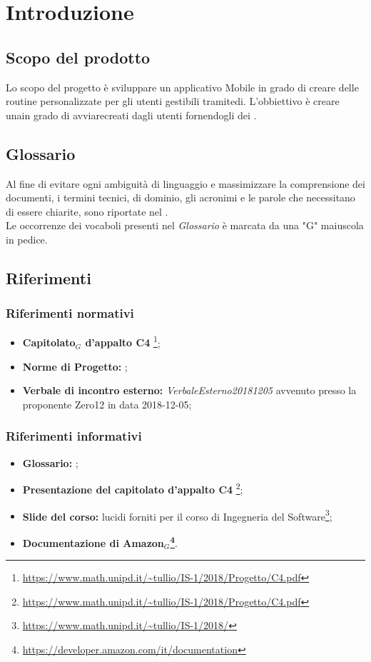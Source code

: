 \chapter{Introduzione}

\section{Scopo del prodotto}
Lo scopo del progetto è sviluppare un applicativo Mobile in grado di creare delle routine personalizzate per gli utenti gestibili tramitedi. L'obbiettivo è creare unain grado di avviarecreati dagli utenti fornendogli dei .
\section{Glossario}
Al fine di evitare ogni ambiguità di linguaggio e massimizzare la comprensione dei documenti, i termini tecnici, di dominio, gli acronimi e le parole che necessitano di essere chiarite, sono riportate nel \glossariodocumento.\\
Le occorrenze dei vocaboli presenti nel \textit{Glossario} è marcata da una "G" maiuscola in pedice.

\section{Riferimenti}

\subsection{Riferimenti normativi}
\begin{itemize}
	
	\item \textbf{Capitolato$_{G}$ d'appalto C4} \footnote{\url{https://www.math.unipd.it/~tullio/IS-1/2018/Progetto/C4.pdf}};
	\item \textbf{Norme di Progetto:} \textit{\normediprogetto};
	\item \textbf{Verbale di incontro esterno:} \textit{VerbaleEsterno20181205} avvenuto presso la proponente Zero12 in data 2018-12-05;

\end{itemize}

\subsection{Riferimenti informativi}
\begin{itemize}
	
	\item \textbf{Glossario:} \textit{\glossariodocumento};
	\item \textbf{Presentazione del capitolato d'appalto C4} \footnote{\url{https://www.math.unipd.it/~tullio/IS-1/2018/Progetto/C4.pdf}};
	\item \textbf{Slide del corso:} lucidi forniti per il corso di Ingegneria del Software\footnote{\url{https://www.math.unipd.it/~tullio/IS-1/2018/}};
	\item \textbf{Documentazione di Amazon$_{G}$\footnote{\url{https://developer.amazon.com/it/documentation}}}.
\end{itemize}
